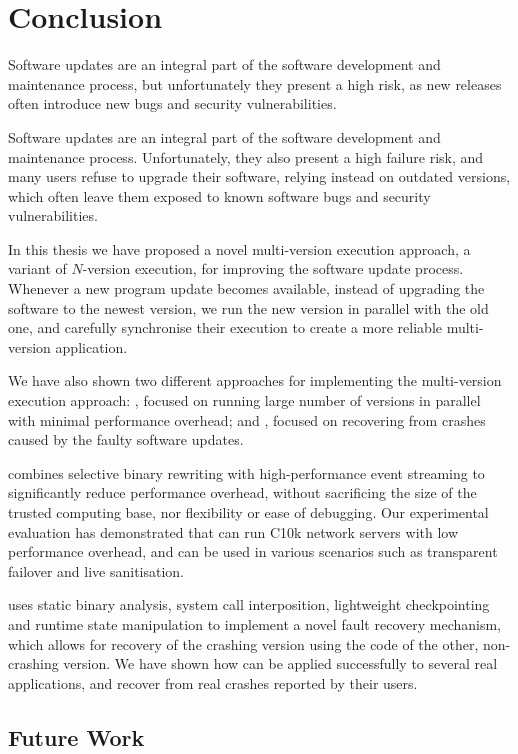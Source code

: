 \chapter{Conclusion}
\label{chap:conclusion}

Software updates are an integral part of the software development and
maintenance process, but unfortunately they present a high risk, as new
releases often introduce new bugs and security vulnerabilities.

Software updates are an integral part of the software development and
maintenance process. Unfortunately, they also present a high failure risk, and
many users refuse to upgrade their software, relying instead on outdated
versions, which often leave them exposed to known software bugs and security
vulnerabilities.

In this thesis we have proposed a novel multi-version execution approach, a
variant of $N$-version execution, for improving the software update process.
Whenever a new program update becomes available, instead of upgrading the
software to the newest version, we run the new version in parallel with the old
one, and carefully synchronise their execution to create a more reliable
multi-version application.

We have also shown two different approaches for implementing the multi-version
execution approach: \varan, focused on running large number of versions in
parallel with minimal performance overhead; and \mx, focused on recovering from
crashes caused by the faulty software updates.

\varan combines selective binary rewriting with high-performance event
streaming to significantly reduce performance overhead, without sacrificing the
size of the trusted computing base, nor flexibility or ease of debugging.  Our
experimental evaluation has demonstrated that \varan can run C10k network
servers with low performance overhead, and can be used in various scenarios
such as transparent failover and live sanitisation.

\mx uses static binary analysis, system call interposition, lightweight
checkpointing and runtime state manipulation to implement a novel fault recovery
mechanism, which allows for recovery of the crashing version using the code
of the other, non-crashing version. We have shown how \mx can be applied
successfully to several real applications, and recover from real crashes
reported by their users.

\section{Future Work}
\label{sec:future-work}

